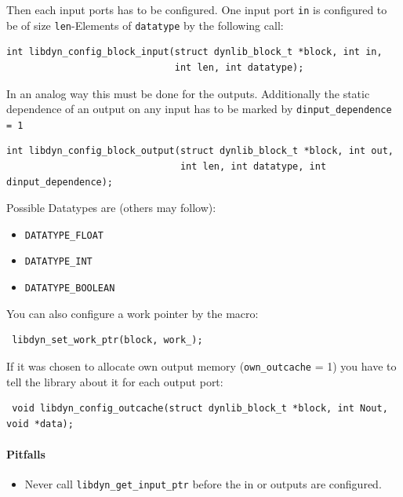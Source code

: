 \documentclass[%
	pdftex,%
	a4paper,%
	oneside,%
	11pt,%
	halfparskip,%
	headsepline,%
	bibtotocnumbered,%
	idxtotoc%
]{scrartcl}
\begin{document}
Then each input ports has to be configured. One input port \texttt{in} is configured to be of size \texttt{len}-Elements of \texttt{datatype} by the following call:

\begin{verbatim}
int libdyn_config_block_input(struct dynlib_block_t *block, int in, 
                              int len, int datatype);
\end{verbatim}

In an analog way this must be done for the outputs. Additionally the static dependence of an output on any input has to be marked by \texttt{dinput\_dependence = 1}

\begin{verbatim}
int libdyn_config_block_output(struct dynlib_block_t *block, int out, 
                               int len, int datatype, int dinput_dependence);
\end{verbatim}

Possible Datatypes are (others may follow):

\begin{itemize}
 \item \texttt{DATATYPE\_FLOAT} 
 \item \texttt{DATATYPE\_INT}
 \item \texttt{DATATYPE\_BOOLEAN}
\end{itemize}

You can also configure a work pointer by the macro:

\begin{verbatim}
 libdyn_set_work_ptr(block, work_);
\end{verbatim}

If it was chosen to allocate own output memory (\texttt{own\_outcache} = 1) you have to tell the library about it for each output port:

\begin{verbatim}
 void libdyn_config_outcache(struct dynlib_block_t *block, int Nout,  void *data);
\end{verbatim}



\paragraph{Pitfalls}

\begin{itemize}
 \item Never call \texttt{libdyn\_get\_input\_ptr} before the in or outputs are configured.
\end{itemize}
\end{document}
